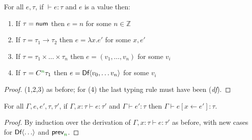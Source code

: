 \begin{lemma}
\label{thm:semantics-df-canon}
For all $e, \tau$, if $\vdash e : \tau$ and $e$ is a value then:
\begin{enumerate}
  \item If $\tau=\ident{num}$ then $e = n$ for some $n \in \mathbb{Z}$
  \item If $\tau=\tau_1 \rightarrow \tau_2$ then $e = \lambda x.e'$ for some $x, e'$
  \item If $\tau=\tau_1\times\ldots\times\tau_n$ then $e = (v_1, \ldots, v_n)$ for some $v_i$
  \item If $\tau=\ctyp{\cclrd{n}}\tau_1$ then $e = \ident{Df}\langle v_0, \ldots v_n\rangle$ for some $v_i$
\end{enumerate}
\end{lemma}
\begin{proof}
  (1,2,3) as before; for (4) the last typing rule must have been (\emph{df}).
\end{proof}

\begin{lemma}
\label{thm:semantics-df-pres-subst}
For all $\Gamma, e, e', \tau, \tau'$, if $\Gamma, x:\tau \vdash e : \tau'$ and $\Gamma \vdash e' : \tau$
then $\Gamma \vdash e[x \leftarrow e'] : \tau$.
\end{lemma}
\begin{proof}
  By induction over the derivation of $\Gamma, x:\tau \vdash e : \tau'$ as before, with new
  cases for $\textnormal{\sffamily Df}\langle\ldots\rangle$ and $\ident{prev}_{\cclrd{n}}$.
\end{proof}

